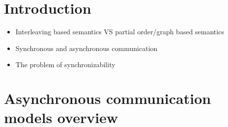 \documentclass[acmsmall,review,anonymous,screen]{acmart}\settopmatter{printfolios=true,printccs=false,printacmref=true}
\begin{document}




\maketitle

\section{Introduction}
\begin{itemize}
  \item Interleaving based semantics VS partial order/graph based semantics
  \item Synchronous and asynchronous communication
  \item The problem of synchronizability
\end{itemize}



\section{Asynchronous communication models overview}
\label{sec:com_models_overview}
\end{document}
